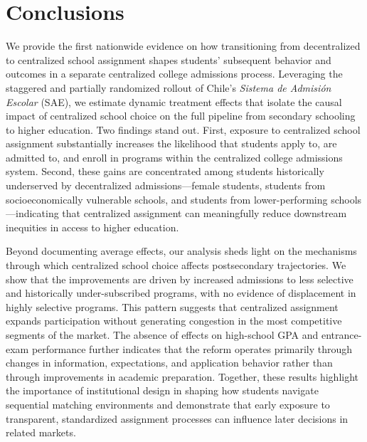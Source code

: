 \documentclass[11pt]{article}
\begin{document}
\section{Conclusions}\label{sec:conclusion}
We provide the first nationwide evidence on how transitioning from decentralized to centralized school assignment shapes students' subsequent behavior and outcomes in a separate centralized college admissions process. Leveraging the staggered and partially randomized rollout of Chile's \textit{Sistema de Admisión Escolar} (SAE), we estimate dynamic treatment effects that isolate the causal impact of centralized school choice on the full pipeline from secondary schooling to higher education. Two findings stand out. First, exposure to centralized school assignment substantially increases the likelihood that students apply to, are admitted to, and enroll in programs within the centralized college admissions system. Second, these gains are concentrated among students historically underserved by decentralized admissions---female students, students from socioeconomically vulnerable schools, and students from lower-performing schools---indicating that centralized assignment can meaningfully reduce downstream inequities in access to higher education.

Beyond documenting average effects, our analysis sheds light on the mechanisms through which centralized school choice affects postsecondary trajectories. We show that the improvements are driven by increased admissions to less selective and historically under-subscribed programs, with no evidence of displacement in highly selective programs. This pattern suggests that centralized assignment expands participation without generating congestion in the most competitive segments of the market. The absence of effects on high-school GPA and entrance-exam performance further indicates that the reform operates primarily through changes in information, expectations, and application behavior rather than through improvements in academic preparation. Together, these results highlight the importance of institutional design in shaping how students navigate sequential matching environments and demonstrate that early exposure to transparent, standardized assignment processes can influence later decisions in related markets.
\end{document}
